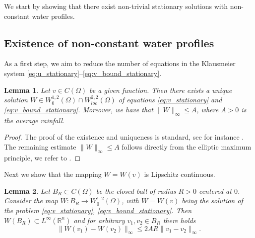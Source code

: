 \documentclass[11pt, a4paper]{article}
\theoremstyle{break}
\theoremstyle{break}
\theoremstyle{break}
\theoremstyle{break}
\theoremstyle{break}
\newtheorem{lem}{Lemma}[section]
\theoremstyle{break}
\theoremstyle{break}
\theoremstyle{break}
\theoremstyle{break}
\theoremstyle{break}
\begin{document}
We start by showing that there exist non-trivial stationary solutions with non-constant water profiles. 

\subsection{Existence of non-constant water profiles}

As a first step, we aim to reduce the number of equations in the Klausmeier system \eqref{eq:u_stationary}--\eqref{eq:v_bound_stationary}. 
 
\begin{lem}
    \label{lem:existence_of_inhomogeneous_elliptic_v}
    Let $v \in C(\Omega)$ be a given function. Then there exists a unique solution $W \in W^{1,2}_0(\Omega) \cap W^{2,2}_{loc}(\Omega)$ of equations \eqref{eq:v_stationary} and \eqref{eq:v_bound_stationary}. Moreover, we have that $\|W \|_\infty \leq A$, where $A >0$ is the average rainfall. 
\end{lem}
\begin{proof}
    The proof of the existence and uniqueness is standard, see for instance \cite[Theorem 8.9]{gilbarg2001elliptic}. The remaining estimate $\|W\|_\infty \leq A$ follows directly from the elliptic maximum principle, we refer to \cite[Chapter 3]{gilbarg2001elliptic}.
\end{proof}

Next we show that the mapping $W = W(v)$ is Lipschitz continuous.
\begin{lem}
    \label{lem:stationary_v_lipschitz_constant}
    Let $B_R \subset C(\Omega)$ be the closed ball of radius $R > 0$ centered at $0$. 
    Consider the map $W : B_R \rightarrow W^{1,2}_0(\Omega)$, with $W=W(v)$ being the solution of the problem \eqref{eq:v_stationary}, \eqref{eq:v_bound_stationary}. Then $W (B_R) \subset L^\infty(\mathbb{R}^n)$ and for arbitrary $v_1, v_2 \in B_R$ there holds
    \begin{equation}
        \|W(v_1) - W(v_2)\|_\infty \leq 2 A R \|v_1 - v_2\|_\infty.
    \end{equation}
\end{lem}
\end{document}
